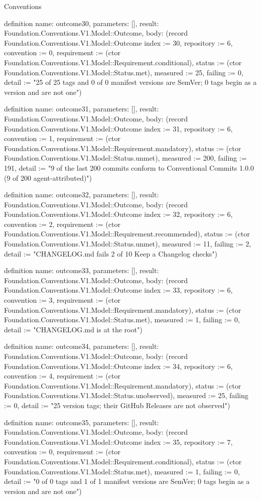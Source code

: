 \begin{lexlean}{Conventions}
\begin{semanticmodule}
definition{
  name: outcome30,
  parameters: [],
  result: Foundation.Conventions.V1.Model::Outcome,
  body: (record Foundation.Conventions.V1.Model::Outcome {index := 30, repository := 6, convention := 0, requirement := (ctor Foundation.Conventions.V1.Model::Requirement.conditional), status := (ctor Foundation.Conventions.V1.Model::Status.met), measured := 25, failing := 0, detail := "25 of 25 tags and 0 of 0 manifest versions are SemVer; 0 tags begin as a version and are not one"})
}

definition{
  name: outcome31,
  parameters: [],
  result: Foundation.Conventions.V1.Model::Outcome,
  body: (record Foundation.Conventions.V1.Model::Outcome {index := 31, repository := 6, convention := 1, requirement := (ctor Foundation.Conventions.V1.Model::Requirement.mandatory), status := (ctor Foundation.Conventions.V1.Model::Status.unmet), measured := 200, failing := 191, detail := "9 of the last 200 commits conform to Conventional Commits 1.0.0 (9 of 200 agent-attributed)"})
}

definition{
  name: outcome32,
  parameters: [],
  result: Foundation.Conventions.V1.Model::Outcome,
  body: (record Foundation.Conventions.V1.Model::Outcome {index := 32, repository := 6, convention := 2, requirement := (ctor Foundation.Conventions.V1.Model::Requirement.recommended), status := (ctor Foundation.Conventions.V1.Model::Status.unmet), measured := 11, failing := 2, detail := "CHANGELOG.md fails 2 of 10 Keep a Changelog checks"})
}

definition{
  name: outcome33,
  parameters: [],
  result: Foundation.Conventions.V1.Model::Outcome,
  body: (record Foundation.Conventions.V1.Model::Outcome {index := 33, repository := 6, convention := 3, requirement := (ctor Foundation.Conventions.V1.Model::Requirement.mandatory), status := (ctor Foundation.Conventions.V1.Model::Status.met), measured := 1, failing := 0, detail := "CHANGELOG.md is at the root"})
}

definition{
  name: outcome34,
  parameters: [],
  result: Foundation.Conventions.V1.Model::Outcome,
  body: (record Foundation.Conventions.V1.Model::Outcome {index := 34, repository := 6, convention := 4, requirement := (ctor Foundation.Conventions.V1.Model::Requirement.mandatory), status := (ctor Foundation.Conventions.V1.Model::Status.unobserved), measured := 25, failing := 0, detail := "25 version tags; their GitHub Releases are not observed"})
}

definition{
  name: outcome35,
  parameters: [],
  result: Foundation.Conventions.V1.Model::Outcome,
  body: (record Foundation.Conventions.V1.Model::Outcome {index := 35, repository := 7, convention := 0, requirement := (ctor Foundation.Conventions.V1.Model::Requirement.conditional), status := (ctor Foundation.Conventions.V1.Model::Status.met), measured := 1, failing := 0, detail := "0 of 0 tags and 1 of 1 manifest versions are SemVer; 0 tags begin as a version and are not one"})
}


\end{semanticmodule}
\end{lexlean}
